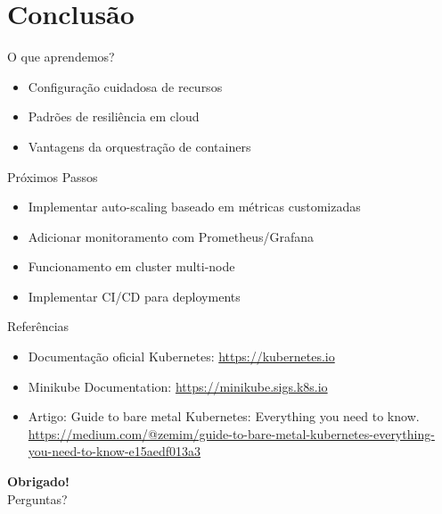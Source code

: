 \documentclass{beamer}
\begin{document}
\section{Conclusão}

\begin{frame}{O que aprendemos?}
    \begin{itemize}
        \item Configuração cuidadosa de recursos
        \item Padrões de resiliência em cloud
        \item Vantagens da orquestração de containers
    \end{itemize}
\end{frame}

\begin{frame}{Próximos Passos}
    \begin{itemize}
        \item Implementar auto-scaling baseado em métricas customizadas
        \item Adicionar monitoramento com Prometheus/Grafana
        \item Funcionamento em cluster multi-node
        \item Implementar CI/CD para deployments
    \end{itemize}
\end{frame}

\begin{frame}{Referências}
    \begin{itemize}
        \item Documentação oficial Kubernetes: \url{https://kubernetes.io}
        \item Minikube Documentation: \url{https://minikube.sigs.k8s.io}
        \item Artigo: Guide to bare metal Kubernetes: Everything you need to know. 
         \line \url{https://medium.com/@zemim/guide-to-bare-metal-kubernetes-everything-you-need-to-know-e15aedf013a3}
    \end{itemize}
    \centering
    \vspace{1cm}
    \textbf{Obrigado!}\\
    \small Perguntas?
\end{frame}
\end{document}
